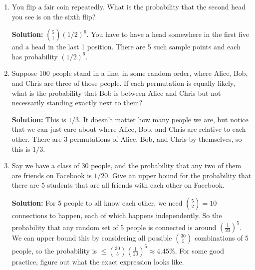 \documentclass{article}
\newenvironment{solution}{

            \color{blue} \smallskip \textbf{Solution:}}{}
\begin{document}
\begin{enumerate}
\begin{solution}
        \end{solution}
        \item You flip a fair coin repeatedly. What is the probability that the second head you see is on the sixth flip?
        \begin{solution}
           $ {5 \choose 1} (1/2)^6$. You have to have a head somewhere in the first five and a head in the last 1
            position. There are  5  such sample points and each has probability $(1/2)^6$.
        \end{solution}
        \item Suppose 100 people stand in a line, in some random order, where Alice, Bob, and Chris are three of those people. If each permutation is equally likely, what is the probability that Bob is between Alice and Chris but not necessarily standing exactly next to them?
        \begin{solution}
            This is $1/3$. It doesn't matter how many people we are, but notice that we can just care about where Alice, Bob, and Chris are relative to each other. There are $3$ permutations of Alice, Bob, and Chris by themselves, so
            this is $1/3$.
        \end{solution}
        \item Say we have a class of 30 people, and the probability that any two of them are friends on Facebook is $1/20$. Give an upper bound for the probability that there are 5 students that are all friends with each other on Facebook.
        \begin{solution}
        For 5 people to all know each other, we need ${5 \choose 2} = 10$ connections to happen, each of which happens independently. So the probability that any random set of 5 people is connected is around $\left(\frac{1}{20}\right)^{5}$. We can upper bound this by considering
        all possible ${30 \choose 5}$ combinations of 5 people, so the probability is $\leq {30 \choose 5} \left(\frac{1}{20}\right)^{5} \approx 4.45\%$. For some good practice, figure out what the exact expression looks like.
        \end{solution}
    \end{enumerate}
\end{document}
